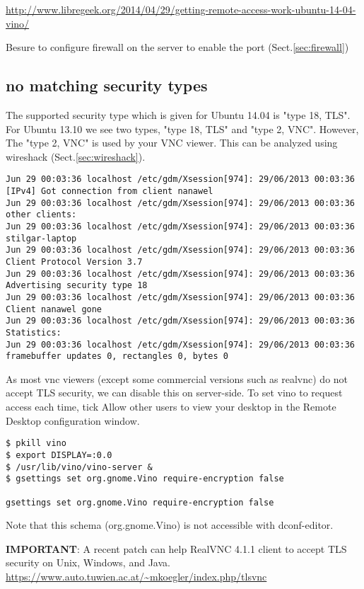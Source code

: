 \url{http://www.libregeek.org/2014/04/29/getting-remote-access-work-ubuntu-14-04-vino/}

Besure to configure firewall on the server to enable the port
(Sect.\ref{sec:firewall})

\subsection{no matching security types}

The supported security type which is given for Ubuntu 14.04 is "type 18, TLS".
For Ubuntu 13.10 we see two types, "type 18, TLS" and "type 2, VNC".
However, The "type 2, VNC" is used by your VNC viewer. This can be analyzed
using wireshack (Sect.\ref{sec:wireshack}).

\begin{verbatim}
Jun 29 00:03:36 localhost /etc/gdm/Xsession[974]: 29/06/2013 00:03:36 [IPv4] Got connection from client nanawel
Jun 29 00:03:36 localhost /etc/gdm/Xsession[974]: 29/06/2013 00:03:36   other clients:
Jun 29 00:03:36 localhost /etc/gdm/Xsession[974]: 29/06/2013 00:03:36      stilgar-laptop
Jun 29 00:03:36 localhost /etc/gdm/Xsession[974]: 29/06/2013 00:03:36 Client Protocol Version 3.7
Jun 29 00:03:36 localhost /etc/gdm/Xsession[974]: 29/06/2013 00:03:36 Advertising security type 18
Jun 29 00:03:36 localhost /etc/gdm/Xsession[974]: 29/06/2013 00:03:36 Client nanawel gone
Jun 29 00:03:36 localhost /etc/gdm/Xsession[974]: 29/06/2013 00:03:36 Statistics:
Jun 29 00:03:36 localhost /etc/gdm/Xsession[974]: 29/06/2013 00:03:36   framebuffer updates 0, rectangles 0, bytes 0
\end{verbatim}

As most vnc viewers (except some commercial versions such as realvnc) do not
accept TLS security, we can disable this on server-side. To set vino to request
access each time, tick Allow other users to view your desktop in the Remote
Desktop configuration window.
\begin{verbatim}
$ pkill vino
$ export DISPLAY=:0.0
$ /usr/lib/vino/vino-server &
$ gsettings set org.gnome.Vino require-encryption false

gsettings set org.gnome.Vino require-encryption false
\end{verbatim}
Note that this schema (org.gnome.Vino) is not accessible with dconf-editor.

{\bf IMPORTANT}: A recent patch can help RealVNC 4.1.1 client to accept TLS
security on Unix, Windows, and Java. 
\url{https://www.auto.tuwien.ac.at/~mkoegler/index.php/tlsvnc}

